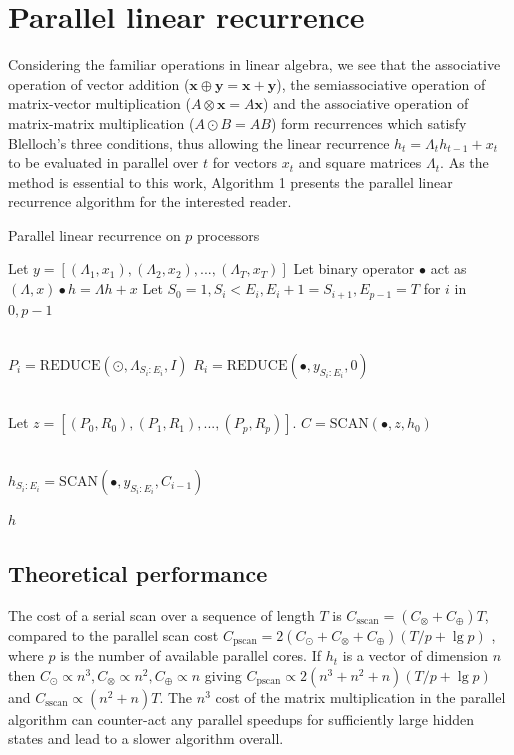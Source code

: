 \documentclass{article}
\providecommand{\scan}{\text{SCAN}}
\providecommand{\reduce}{\text{REDUCE}}
\begin{document}
\section{Parallel linear recurrence}
Considering the familiar operations in linear algebra, we see that the
associative operation of vector addition ($\boldsymbol{x} \oplus \boldsymbol{y}
= \boldsymbol{x} + \boldsymbol{y}$), the semiassociative operation of
matrix-vector multiplication ($A \otimes \boldsymbol{x} = A\boldsymbol{x}$) and
the associative operation of matrix-matrix multiplication ($A \odot B=AB$) form
recurrences which satisfy Blelloch's three conditions, thus allowing the linear
recurrence $h_t = \Lambda_t h_{t-1} + x_t$ to be evaluated in parallel over $t$
for vectors $x_t$ and square matrices $\Lambda_t$. As the method is essential to
this work, Algorithm 1 presents the parallel linear recurrence algorithm for the
interested reader.
\begin{algorithm}
  \label{alg:plr}
\caption{Parallel linear recurrence on $p$ processors}
\begin{algorithmic}[1]
  \State Let $y = [(\Lambda_1, x_1), (\Lambda_2, x_2), ..., (\Lambda_T, x_T)]$
  \State Let binary operator $\bullet$ act as $(\Lambda, x) \bullet h = \Lambda h + x$
  \State Let $S_0=1, S_i < E_i, E_i + 1 = S_{i+1}, E_{p-1}=T$ for $i$ in $0,p-1$

  \\
    \State $P_i = \reduce(\odot, \Lambda_{S_i:E_i}, I)$
    \State $R_i = \reduce(\bullet, y_{S_i:E_i}, 0)$
  \EndParFor

  \\
  \State Let $z = [(P_0, R_0), (P_1, R_1), ..., (P_p, R_p)]$.
  \State $C = \scan(\bullet, z, h_0)$   

  \\
    \State $h_{S_i:E_i} = \scan(\bullet, y_{S_i:E_i}, C_{i-1})$
  \EndParFor
  
  \State \Return $h$
\end{algorithmic}
\end{algorithm}

\subsection{Theoretical performance}
The cost of a serial scan over a sequence of length $T$ is 
$C_\text{sscan} = (C_\otimes + C_\oplus)T$, compared to the parallel scan cost
$C_\text{pscan} = 2(C_\odot + C_\otimes + C_\oplus)(T/p + \lg p)$ \cite{blelloch1990prefix},
where \(p\) is the number of available parallel cores. 
If $h_t$ is a vector of dimension $n$ then 
$C_\odot\propto n^3, C_\otimes\propto n^2, C_\oplus\propto n$ giving
$C_\text{pscan} \propto 2(n^3 + n^2 + n)(T/p + \lg p)$ and 
$C_\text{sscan} \propto (n^2 + n)T$. The $n^3$ cost of the matrix
multiplication in the parallel algorithm can counter-act any parallel speedups for
sufficiently large hidden states and lead to a slower algorithm overall.
\end{document}
